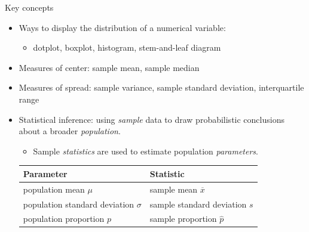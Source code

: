 \documentclass{beamer}
\begin{document}

%
%
%


\begin{frame}{Key concepts}
\begin{itemize}

\item Ways to display the distribution of a numerical variable:
\begin{itemize}
\item dotplot, boxplot, histogram, stem-and-leaf diagram
\end{itemize}
\item Measures of center: sample mean, sample median
\item Measures of spread: sample variance, sample standard deviation, interquartile range
\item Statistical inference: using \textit{sample} data to draw probabilistic conclusions about a broader 
\textit{population}.
\begin{itemize}
\item Sample \textit{statistics} are used to estimate population \textit{parameters}.
\end{itemize}

\vspace{.1in}
\begin{center}\begin{tabular}{l|l}
Parameter & Statistic \\ \hline
population mean $\mu$ & sample mean $\overline{x}$ \\
population standard deviation $\sigma$ & sample standard deviation $s$ \\
population proportion $p$ & sample proportion $\hat{p}$
\end{tabular}
\end{center}
\end{itemize}
\end{frame}
\end{document}
